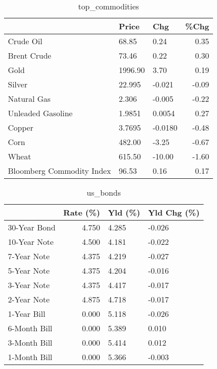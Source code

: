 \documentclass{article}%
\begin{document}
\begin{table}[htbp]%
\caption{top\_commodities}%
\centering%
\begin{adjustbox}{width=1\textwidth}%
\begin{tabular}{lllr}
\toprule
                          &   Price &     Chg &  \%Chg \\
\midrule
               Crude Oil  &   68.85 &    0.24 &  0.35 \\
             Brent Crude  &   73.46 &    0.22 &  0.30 \\
                    Gold  & 1996.90 &    3.70 &  0.19 \\
                  Silver  &  22.995 &  -0.021 & -0.09 \\
             Natural Gas  &   2.306 &  -0.005 & -0.22 \\
       Unleaded Gasoline  &  1.9851 &  0.0054 &  0.27 \\
                  Copper  &  3.7695 & -0.0180 & -0.48 \\
                    Corn  &  482.00 &   -3.25 & -0.67 \\
                   Wheat  &  615.50 &  -10.00 & -1.60 \\
Bloomberg Commodity Index &   96.53 &    0.16 &  0.17 \\
\bottomrule
\end{tabular}
%
\end{adjustbox}%
\end{table}

%


\begin{table}[htbp]%
\caption{us\_bonds}%
\centering%
\begin{adjustbox}{width=1\textwidth}%
\begin{tabular}{lrll}
\toprule
             &  Rate (\%) & Yld (\%) & Yld Chg (\%) \\
\midrule
30-Year Bond &     4.750 &   4.285 &      -0.026 \\
10-Year Note &     4.500 &   4.181 &      -0.022 \\
 7-Year Note &     4.375 &   4.219 &      -0.027 \\
 5-Year Note &     4.375 &   4.204 &      -0.016 \\
 3-Year Note &     4.375 &   4.417 &      -0.017 \\
 2-Year Note &     4.875 &   4.718 &      -0.017 \\
 1-Year Bill &     0.000 &   5.118 &      -0.026 \\
6-Month Bill &     0.000 &   5.389 &       0.010 \\
3-Month Bill &     0.000 &   5.414 &       0.012 \\
1-Month Bill &     0.000 &   5.366 &      -0.003 \\
\bottomrule
\end{tabular}
%
\end{adjustbox}%
\end{table}
\end{document}
